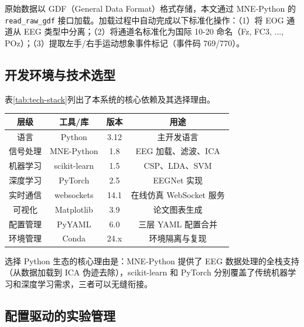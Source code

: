 原始数据以 GDF（General Data Format）格式存储，本文通过 MNE-Python 的 \texttt{read\_raw\_gdf} 接口加载。加载过程中自动完成以下标准化操作：（1）将 EOG 通道从 EEG 类型中分离；（2）将通道名标准化为国际 10-20 命名（Fz, FC3, ..., POz）；（3）提取左手/右手运动想象事件标记（事件码 769/770）。

\subsection{开发环境与技术选型}
\label{sec:tech-stack}

表\ref{tab:tech-stack}列出了本系统的核心依赖及其选择理由。

\begin{table}[htbp]
	\centering
	\begin{tabular}{cccc}
		\toprule
		层级 & 工具/库 & 版本 & 用途 \\
		\midrule
		语言 & Python & 3.12 & 主开发语言 \\
		信号处理 & MNE-Python\upcite{gramfort2013mne} & 1.8 & EEG 加载、滤波、ICA \\
		机器学习 & scikit-learn\upcite{pedregosa2011sklearn} & 1.5 & CSP、LDA、SVM \\
		深度学习 & PyTorch\upcite{paszke2019pytorch} & 2.5 & EEGNet 实现 \\
		实时通信 & websockets & 14.1 & 在线仿真 WebSocket 服务 \\
		可视化 & Matplotlib & 3.9 & 论文图表生成 \\
		配置管理 & PyYAML & 6.0 & 三层 YAML 配置合并 \\
		环境管理 & Conda & 24.x & 环境隔离与复现 \\
		\bottomrule
	\end{tabular}
\end{table}

选择 Python 生态的核心理由是：MNE-Python 提供了 EEG 数据处理的全栈支持（从数据加载到 ICA 伪迹去除），scikit-learn 和 PyTorch 分别覆盖了传统机器学习和深度学习需求，三者可以无缝衔接。

\subsection{配置驱动的实验管理}
\label{sec:config-system}

